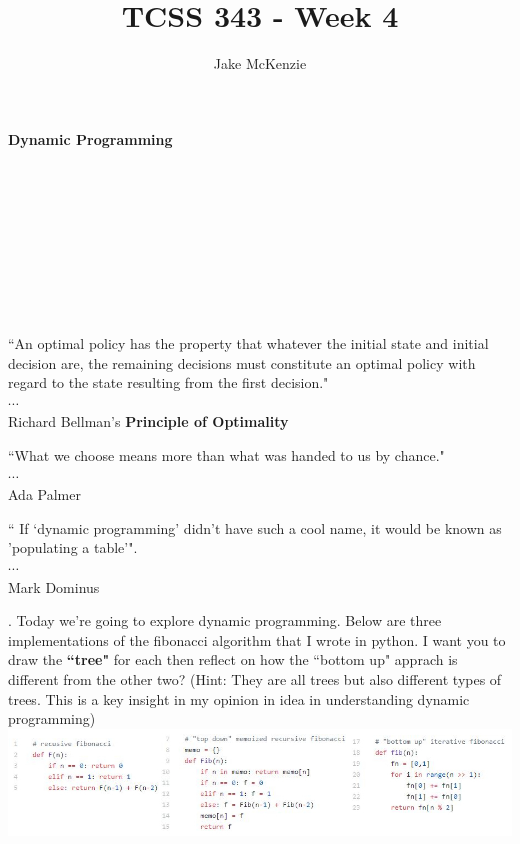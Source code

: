 \documentclass[12pt]{article}
\begin{document}
\title{TCSS 343 - Week 4}
\author{Jake McKenzie}
\maketitle
\noindent\centerline{\textbf{Dynamic Programming}}\\\\\\\\\\\\\\\\
\begin{center}
    ``An optimal policy has the property that whatever the initial state and initial decision are, the remaining decisions must constitute an optimal policy with regard to the state resulting from the first decision." \\$\cdots$\\  Richard Bellman's \textbf{Principle of Optimality}
\end{center}
\begin{center}
    ``What we choose means more than what was handed to us by chance." \\$\cdots$\\  Ada Palmer
\end{center}
\begin{center}
    `` If `dynamic programming' didn't have such a cool name, it would be known as 'populating a table'". \\$\cdots$\\ Mark Dominus 
\end{center}
\newpage
{}. Today we're going to explore dynamic programming. Below are three implementations of the fibonacci algorithm that I wrote in python. I want you to draw the \textbf{``tree"} for each then reflect on how the ``bottom up" apprach is different from the other two? (Hint: They are all trees but also different types of trees. This is a key insight in my opinion in idea in understanding dynamic programming) \\
\includegraphics[width=\linewidth]{fib.jpg}
\newpage
\end{document}
